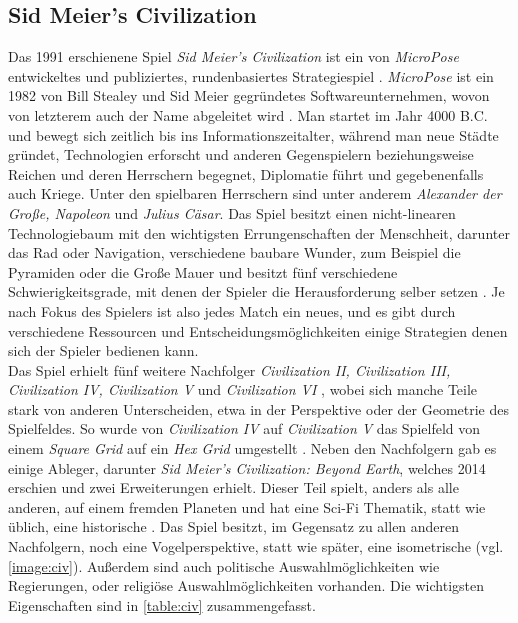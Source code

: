 \subsection{Sid Meier's Civilization}
Das 1991 erschienene Spiel \textit{Sid Meier's Civilization} ist ein von \textit{MicroPose} entwickeltes und publiziertes, rundenbasiertes Strategiespiel \cite*[]{civigdb}. \textit{MicroPose} ist ein 1982 von Bill Stealey und Sid Meier gegründetes Softwareunternehmen, wovon von letzterem auch der Name abgeleitet wird \cite*[]{civhistory}. Man startet im Jahr 4000 B.C. und bewegt sich zeitlich bis ins Informationszeitalter, während man neue Städte gründet, Technologien erforscht und anderen Gegenspielern beziehungsweise Reichen und deren Herrschern begegnet, Diplomatie führt und gegebenenfalls auch Kriege. Unter den spielbaren Herrschern sind unter anderem \textit{Alexander der Große, Napoleon} und \textit{Julius Cäsar}. Das Spiel besitzt einen nicht-linearen Technologiebaum mit den wichtigsten Errungenschaften der Menschheit, darunter das Rad oder Navigation, verschiedene baubare Wunder, zum Beispiel die Pyramiden oder die Große Mauer und besitzt fünf verschiedene Schwierigkeitsgrade, mit denen der Spieler die Herausforderung selber setzen \cite*[]{civ}. Je nach Fokus des Spielers ist also jedes Match ein neues, und es gibt durch verschiedene Ressourcen und Entscheidungsmöglichkeiten einige Strategien denen sich der Spieler bedienen kann. \\
Das Spiel erhielt fünf weitere Nachfolger \textit{Civilization II, Civilization III, Civilization IV, Civilization V} und \textit{Civilization VI} \cite*[]{civall}, wobei sich manche Teile stark von anderen Unterscheiden, etwa in der Perspektive oder der Geometrie des Spielfeldes. So wurde von \textit{Civilization IV} auf \textit{Civilization V} das Spielfeld von einem \textit{Square Grid} auf ein \textit{Hex Grid} umgestellt \cite*[]{civallcompare}. Neben den Nachfolgern gab es einige Ableger, darunter \textit{Sid Meier's Civilization: Beyond Earth}, welches 2014 erschien und zwei Erweiterungen erhielt. Dieser Teil spielt, anders als alle anderen, auf einem fremden Planeten und hat eine Sci-Fi Thematik, statt wie üblich, eine historische \cite*[]{civbe}. Das Spiel besitzt, im Gegensatz zu allen anderen Nachfolgern, noch eine Vogelperspektive, statt wie später, eine isometrische (vgl. \autoref{image:civ}). Außerdem sind auch politische Auswahlmöglichkeiten wie Regierungen, oder religiöse Auswahlmöglichkeiten vorhanden. Die wichtigsten Eigenschaften sind in \autoref{table:civ} zusammengefasst.




